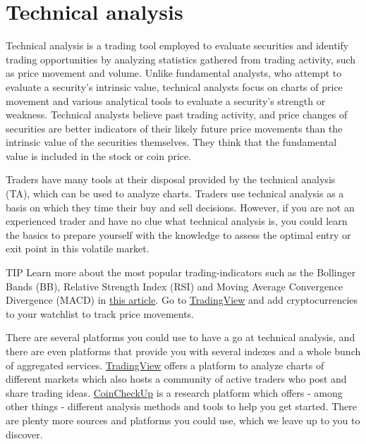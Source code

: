 \section{Technical analysis}
\label{sec:technicalanalysis}

Technical analysis is a trading tool employed to evaluate securities and identify trading opportunities by analyzing statistics gathered from trading activity, such as price movement and volume. Unlike fundamental analysts, who attempt to evaluate a security's intrinsic value, technical analysts focus on charts of price movement and various analytical tools to evaluate a security's strength or weakness. Technical analysts believe past trading activity, and price changes of securities are better indicators of their likely future price movements than the intrinsic value of the securities themselves. They think that the fundamental value is included in the stock or coin price.\medskip

Traders have many tools at their disposal provided by the technical analysis (TA), which can be used to analyze charts. Traders use technical analysis as a basis on which they time their buy and sell decisions. However, if you are not an experienced trader and have no clue what technical analysis is, you could learn the basics to prepare yourself with the knowledge to assess the optimal entry or exit point in this volatile market.

    \bigskip
        \begin{tipbox}{TIP}
        Learn more about the most popular trading-indicators such as the Bollinger Bands (BB), Relative Strength Index (RSI) and Moving Average Convergence Divergence (MACD) in \href{https://medium.com/@harrynicholls/7-popular-technical-indicators-and-how-to-use-them-to-increase-your-trading-profits-7f13ffeb8d05}{this article}.  
        \tcblower
        Go to \href{https://www.tradingview.com/}{TradingView} and add cryptocurrencies to your watchlist to track price movements.
        \end{tipbox}
    \medskip

There are several platforms you could use to have a go at technical analysis, and there are even platforms that provide you with several indexes and a whole bunch of aggregated services. \href{https://www.tradingview.com/}{TradingView} offers a platform to analyze charts of different markets which also hosts a community of active traders who post and share trading ideas. \href{https://coincheckup.com/}{CoinCheckUp} is a research platform which offers - among other things - different analysis methods and tools to help you get started. There are plenty more sources and platforms you could use, which we leave up to you to discover.

